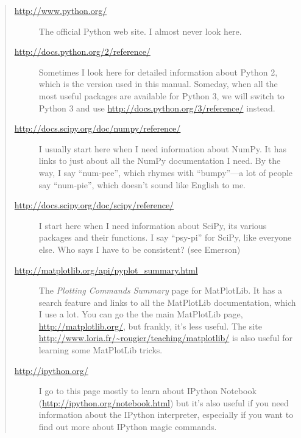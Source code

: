 \documentclass[letterpaper,10pt,english]{sphinxmanual}
\begin{document}
\begin{quote}
\begin{description}
\item[{\href{http://www.python.org/}{http://www.python.org/}}] \leavevmode
The official Python web site.  I almost never look here.

\item[{\href{http://docs.python.org/2/reference/}{http://docs.python.org/2/reference/}}] \leavevmode
Sometimes I look here for detailed information about Python 2, which is the version used in this manual.  Someday, when all the most useful packages are available for Python 3, we will switch to Python 3 and use \href{http://docs.python.org/3/reference/}{http://docs.python.org/3/reference/} instead.

\item[{\href{http://docs.scipy.org/doc/numpy/reference/}{http://docs.scipy.org/doc/numpy/reference/}}] \leavevmode
I usually start here when I need information about NumPy.  It has links to just about all the NumPy documentation I need.  By the way, I say ``num-pee'', which rhymes with ``bumpy''---a lot of people say ``num-pie'', which doesn't sound like English to me.

\item[{\href{http://docs.scipy.org/doc/scipy/reference/}{http://docs.scipy.org/doc/scipy/reference/}}] \leavevmode
I start here when I need information about SciPy, its various packages and their functions.  I say ``psy-pi'' for SciPy, like everyone else.  Who says I have to be consistent? (see Emerson)

\item[{\href{http://matplotlib.org/api/pyplot\_summary.html}{http://matplotlib.org/api/pyplot\_summary.html}}] \leavevmode
The \emph{Plotting Commands Summary} page for MatPlotLib.  It has a search feature and links to all the MatPlotLib documentation, which I use a lot.  You can go the the main MatPlotLib page, \href{http://matplotlib.org/}{http://matplotlib.org/}, but frankly, it's less useful.  The site \href{http://www.loria.fr/~rougier/teaching/matplotlib/}{http://www.loria.fr/\textasciitilde{}rougier/teaching/matplotlib/} is also useful for learning some MatPlotLib tricks.

\item[{\href{http://ipython.org/}{http://ipython.org/}}] \leavevmode
I go to this page mostly to learn about IPython Notebook (\href{http://ipython.org/notebook.html}{http://ipython.org/notebook.html}) but it's also useful if you need information about the IPython interpreter, especially if you want to find out more about IPython magic commands.


\end{description}
\end{quote}
\end{document}
